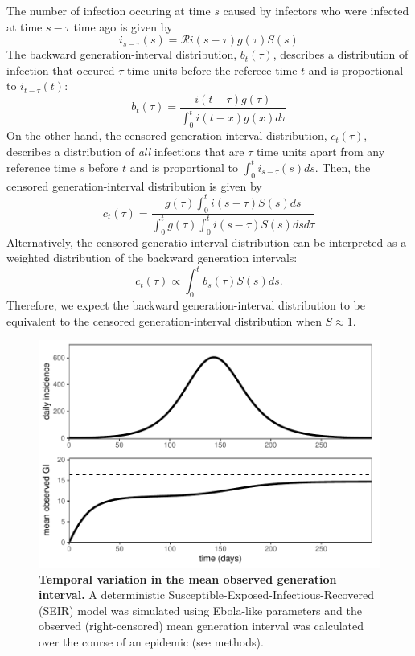 \documentclass[12pt]{article}
\newcommand{\RR}{\ensuremath{{\mathcal R}}}
\begin{document}
The number of infection occuring at time $s$ caused by infectors who were infected at time $s-\tau$ time ago is given by
\begin{equation}
i_{s-\tau}(s) = \RR i(s-\tau) g(\tau) S(s)
\end{equation}
The backward generation-interval distribution, $b_t(\tau)$, describes a distribution of infection that occured $\tau$ time units before the referece time $t$ and is proportional to $i_{t-\tau}(t)$:
\begin{equation}
b_t(\tau) = \frac{i(t-\tau) g(\tau)}{\int_0^t i(t-x) g(x) d\tau}
\end{equation}
On the other hand, the censored generation-interval distribution, $c_t(\tau)$, describes a distribution of \emph{all} infections that are $\tau$ time units apart from any reference time $s$ before $t$ and is proportional to $\int_0^t i_{s-\tau}(s) ds$.
Then, the censored generation-interval distribution is given by
\begin{equation}\label{eq:obsg}
c_t(\tau) = \frac{g(\tau) \int_0^t i(s-\tau) S(s) ds}{\int_0^t g(\tau) \int_0^t i(s-\tau) S(s) ds d\tau}
\end{equation}
Alternatively, the censored generatio-interval distribution can be interpreted as a weighted distribution of the backward generation intervals:
\begin{equation}
c_t(\tau) \propto \int_0^t b_s(\tau) S(s) ds.
\end{equation}
Therefore, we expect the backward generation-interval distribution to be equivalent to the censored generation-interval distribution when $S \approx 1$.

\begin{figure}[t]
\includegraphics[width=\textwidth]{../fig/temporal_effect.pdf}
\caption{\textbf{Temporal variation in the mean observed generation interval.}
A deterministic Susceptible-Exposed-Infectious-Recovered (SEIR) model was simulated using Ebola-like parameters and the observed (right-censored) mean generation interval was calculated over the course of an epidemic (see methods).
}
\label{fig:censor}
\end{figure}
\end{document}
